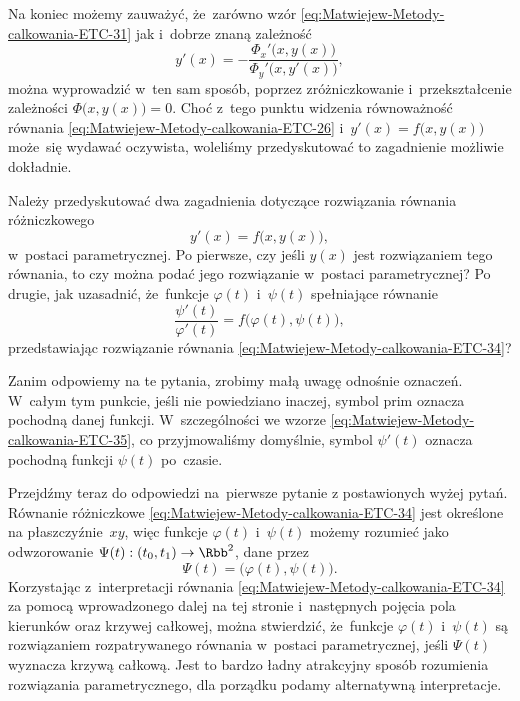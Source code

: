 \documentclass[a4paper,11pt]{article}
\numberwithin{equation}{section}
\begin{document}
Na koniec możemy zauważyć, że~zarówno wzór
\eqref{eq:Matwiejew-Metody-calkowania-ETC-31} jak i~dobrze znaną zależność
\begin{equation}
  \label{eq:Uwagi-do-konkrentych-stron-14}
  y'( x ) =
  -\frac{ \Phi_{ x }'\big( x, y( x ) \big) }{ \Phi_{ y }'\big( x, y'( x ) \big) },
\end{equation}
można wyprowadzić w~ten sam sposób, poprzez zróżniczkowanie
i~przekształcenie zależności $\Phi\big( x, y( x ) \big) = 0$. Choć z~tego
punktu widzenia równoważność równania
\eqref{eq:Matwiejew-Metody-calkowania-ETC-26}
i~$y'( x ) = f\big( x, y( x ) \big)$ może~się wydawać oczywista, woleliśmy
przedyskutować to zagadnienie możliwie dokładnie.

\VerSpaceFour





\noindent
{} Należy przedyskutować dwa zagadnienia dotyczące rozwiązania
równania różniczkowego
\begin{equation}
  \label{eq:Uwagi-do-konkrentych-stron-15}
  y'( x ) = f\big( x, y( x ) \big),
\end{equation}
w~postaci parametrycznej. Po pierwsze, czy jeśli $y( x )$ jest rozwiązaniem
tego równania, to czy można podać jego rozwiązanie w~postaci parametrycznej?
Po drugie, jak uzasadnić, że~funkcje $\varphi( t )$ i~$\psi( t )$ spełniające
równanie
\begin{equation}
  \label{eq:Uwagi-do-konkrentych-stron-16}
  \frac{ \psi'( t ) }{ \varphi'( t ) } =
  f\big( \varphi( t ), \psi( t ) \big),
\end{equation}
przedstawiając rozwiązanie równania
\eqref{eq:Matwiejew-Metody-calkowania-ETC-34}?

Zanim odpowiemy na te pytania, zrobimy małą uwagę odnośnie oznaczeń.
W~całym tym punkcie, jeśli nie powiedziano inaczej, symbol prim oznacza
pochodną danej funkcji. W~szczególności we wzorze
\eqref{eq:Matwiejew-Metody-calkowania-ETC-35}, co przyjmowaliśmy domyślnie,
symbol $\psi'( t )$ oznacza pochodną funkcji $\psi( t )$ po~czasie.

Przejdźmy teraz do odpowiedzi na~pierwsze pytanie z postawionych wyżej
pytań. Równanie różniczkowe \eqref{eq:Matwiejew-Metody-calkowania-ETC-34}
jest określone na płaszczyźnie~$xy$, więc funkcje $\varphi( t )$ i~$\psi( t )$ możemy
rozumieć jako odwzorowanie $\Psi( t ) : ( t_{ 0 }, t_{ 1 } ) \to \Rbb^{ 2 }$, dane
przez
\begin{equation}
  \label{eq:Uwagi-do-konkrentych-stron-17}
  \Psi( t ) = \big( \varphi( t ), \psi( t ) \big).
\end{equation}
Korzystając z~interpretacji równania
\eqref{eq:Matwiejew-Metody-calkowania-ETC-34} za pomocą wprowadzonego dalej
na tej stronie i~następnych pojęcia pola kierunków oraz krzywej całkowej,
można stwierdzić, że~funkcje $\varphi( t )$ i~$\psi( t )$ są rozwiązaniem
rozpatrywanego równania w~postaci parametrycznej, jeśli $\Psi( t )$ wyznacza
krzywą całkową. Jest to bardzo ładny atrakcyjny sposób rozumienia
rozwiązania parametrycznego, dla porządku podamy alternatywną interpretacje.
\end{document}
